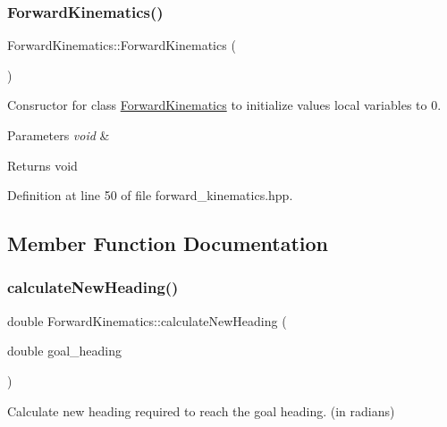 \subsubsection{\texorpdfstring{Forward\+Kinematics()}{ForwardKinematics()}}
{\footnotesize\ttfamily Forward\+Kinematics\+::\+Forward\+Kinematics (\begin{DoxyParamCaption}{ }\end{DoxyParamCaption})\hspace{0.3cm}{\ttfamily [inline]}}



Consructor for class \hyperlink{classForwardKinematics}{Forward\+Kinematics} to initialize values local variables to 0. 


\begin{DoxyParams}{Parameters}
{\em void} & \\
\hline
\end{DoxyParams}
\begin{DoxyReturn}{Returns}
void 
\end{DoxyReturn}


Definition at line 50 of file forward\+\_\+kinematics.\+hpp.



\subsection{Member Function Documentation}
\mbox{\label{classForwardKinematics_a005d9cbb53f4dbb79b16defb52a8e76a}} 
\subsubsection{\texorpdfstring{calculate\+New\+Heading()}{calculateNewHeading()}}
{\footnotesize\ttfamily double Forward\+Kinematics\+::calculate\+New\+Heading (\begin{DoxyParamCaption}\item[{double}]{goal\+\_\+heading }\end{DoxyParamCaption})}



Calculate new heading required to reach the goal heading. (in radians) 


